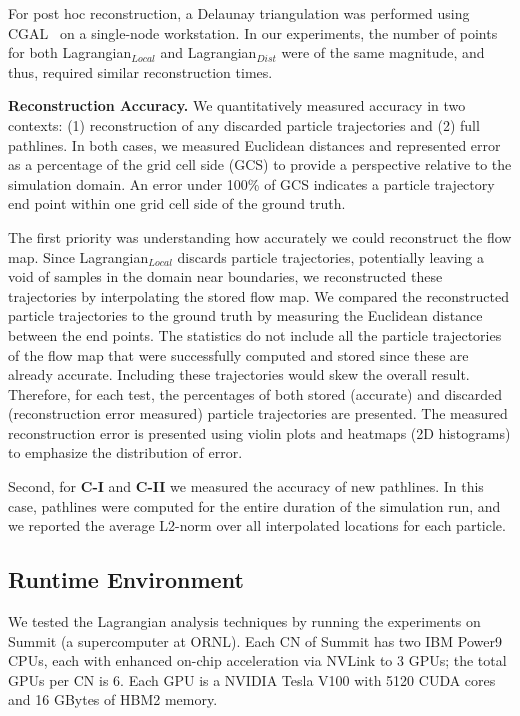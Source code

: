 For post hoc reconstruction, a Delaunay triangulation was performed using CGAL~\cite{2020cgal} on a single-node workstation.
%
In our experiments, the number of points for both Lagrangian$_{Local}$ and Lagrangian$_{Dist}$ were of the same magnitude, and thus, required similar reconstruction times.
%

\textbf{Reconstruction Accuracy.} We quantitatively measured accuracy in two contexts: (1) reconstruction of any discarded particle trajectories and (2) full pathlines.  
%
In both cases, we measured Euclidean distances and represented error as a percentage of the grid cell side (GCS) to provide a perspective relative to the simulation domain.
%
An error under 100\% of GCS indicates a particle trajectory end point within one grid cell side of the ground truth.

The first priority was understanding how accurately we could reconstruct the flow map. 
%
Since Lagrangian$_{Local}$ discards particle trajectories, potentially leaving a void of samples in the domain near boundaries, we reconstructed these trajectories by interpolating the stored flow map.
%
We compared the reconstructed particle trajectories to the ground truth by measuring the Euclidean distance between the end points.
%
The statistics do not include all the particle trajectories of the flow map that were successfully computed and stored since these are already accurate.
%
Including these trajectories would skew the overall result.
%
Therefore, for each test, the percentages of both stored (accurate) and discarded (reconstruction error measured) particle trajectories are presented.
%
The measured reconstruction error is presented using violin plots and heatmaps (2D histograms) to emphasize the distribution of error. 

Second, for \textbf{C-I} and \textbf{C-II} we measured the accuracy of new pathlines.
%
In this case, pathlines were computed for the entire duration of the simulation run, and we reported the average L2-norm over all interpolated locations for each particle.
%

\vspace{-2mm}
\subsection{Runtime Environment}
\label{sec:runtime}
We tested the Lagrangian analysis techniques by running the experiments on Summit (a supercomputer at ORNL).
%
Each CN of Summit has two IBM Power9 CPUs,
%
each with enhanced on-chip acceleration via NVLink to 3 GPUs; the total GPUs per CN is 6.
%
Each GPU is a NVIDIA Tesla V100 with 5120 CUDA cores and 16 GBytes of HBM2 memory.
